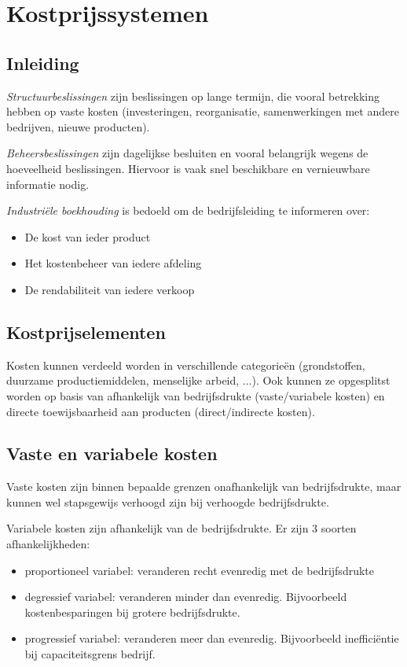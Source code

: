 \documentclass[../../samenvatting.tex]{subfiles}
\begin{document}
\section{Kostprijssystemen}
\subsection{Inleiding}
\emph{Structuurbeslissingen} zijn beslissingen op lange termijn, die vooral betrekking hebben op vaste kosten (investeringen, reorganisatie, samenwerkingen met andere bedrijven, nieuwe producten).

\emph{Beheersbeslissingen} zijn dagelijkse besluiten en vooral belangrijk wegens de hoeveelheid beslissingen. Hiervoor is vaak snel beschikbare en vernieuwbare informatie nodig.

\emph{Industriële boekhouding} is bedoeld om de bedrijfsleiding te informeren over:
\begin{itemize}
    \item De kost van ieder product
    \item Het kostenbeheer van iedere afdeling
    \item De rendabiliteit van iedere verkoop
\end{itemize}

\subsection{Kostprijselementen}
Kosten kunnen verdeeld worden in verschillende categorieën (grondstoffen, duurzame productiemiddelen, menselijke arbeid, ...). Ook kunnen ze opgesplitst worden op basis van afhankelijk van bedrijfsdrukte (vaste/variabele kosten) en directe toewijsbaarheid aan producten (direct/indirecte kosten).

\subsection{Vaste en variabele kosten}
Vaste kosten zijn binnen bepaalde grenzen onafhankelijk van bedrijfsdrukte, maar kunnen wel stapsgewijs verhoogd zijn bij verhoogde bedrijfsdrukte.

Variabele kosten zijn afhankelijk van de bedrijfsdrukte. Er zijn 3 soorten afhankelijkheden:
\begin{itemize}
    \item proportioneel variabel: veranderen recht evenredig met de bedrijfsdrukte
    \item degressief variabel: veranderen minder dan evenredig. Bijvoorbeeld kostenbesparingen bij grotere bedrijfsdrukte.
    \item progressief variabel: veranderen meer dan evenredig. Bijvoorbeeld inefficiëntie bij capaciteitsgrens bedrijf.
\end{itemize}
\end{document}
